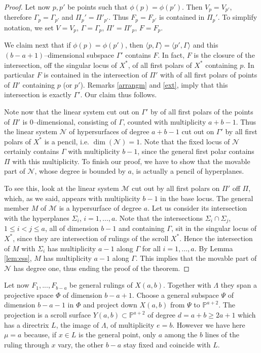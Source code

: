 \documentclass[11pt]{article}   %
\theoremstyle{definition}
\numberwithin{Theorem}{section} \numberwithin{equation}{section}
\newcommand{\MM}{{\mathcal M}}
\newcommand{\NN}{{\mathcal N}}
\newcommand{\p}{{\mathbb P}}
\begin{document}
{\begin{proof}
Let now $p,p'$ be points such that $\phi(p)=\phi(p')$. Then $V_p=V_{p'}$,
therefore $\Gamma_p=\Gamma_{p'}$
and $\Pi_p'=\Pi'_{p'}$.  Thus $F_p=F_{p'}$
is contained in $\Pi_p'$. To simplify notation,
we set $V=V_p$, $\Gamma=\Gamma_p$,
$\Pi'=\Pi'_p$, $F=F_p$.

We claim next that if  $\phi(p)=\phi(p')$,
then $\langle p,\Gamma\rangle=\langle p',\Gamma\rangle$
and this $(b-a+1)$--dimensional
subspace $\Gamma'$ contains $F$.
In fact, $F$ is the closure of the intersection, off the singular
locus of $X^ *$, of all
first polars of $X^ *$ containing $p$. In particular $F$ is contained
in the intersection of $\Pi'$ with of all first polars  of points of $\Pi'$
containing $p$ (or $p'$).
Remarks \ref {arrangm} and \ref {ext}, imply that this intersection
is exactly $\Gamma'$. Our claim thus follows.

Note now that the linear system cut out on $\Gamma'$ by of all first polars of the
points of $\Pi'$ is $0$--dimensional, consisting of $\Gamma$, counted
with multiplicity $a+b-1$. Thus
the linear system $\NN$ of hypersurfaces of degree $a+b-1$
cut out on $\Gamma'$ by all first polars
of $X^ *$ is a pencil, i.e.  $\dim(\NN)=1$.  Note that the fixed locus of
$\NN$ certainly contains $\Gamma$ with multiplicity $b-1$,
since the general first polar contains $\Pi$ with this multiplicity.
To finish our proof, we have to show that the movable part
of $\NN$, whose degree is bounded by $a$, is actually a pencil of hyperplanes.

To see this,  look at the linear system $\MM$ cut out by all first polars
on $\Pi'$ off $\Pi$, which, as we said, appears with multiplicity $b-1$ in the base locus.
The general member $M$ of $\MM$ is a hypersurface of degree $a$. Let us
consider its intersection with the hyperplanes $\Sigma_i$, $i=1,\dots,a$. Note that the
intersections $\Sigma_i\cap\Sigma_j$, $1\leq i<j\leq a$, all of dimension $b-1$ and
containing $\Gamma$, sit in the singular locus of $X^ *$, since they are intersection
of rulings of the scroll $X^ *$. Hence the
intersection of $M$ with $\Sigma_i$ has multiplicity $a-1$ along $\Gamma$
for all $i=1,\dots,a$. By Lemma \ref {lem:ess}, $M$ has multiplicity $a-1$ along
$\Gamma$. This implies  that the movable part
of $\NN$ has degree one, thus ending the proof of the theorem.
\end{proof}


Let now $F_1,...,F_{b-a}$ be general
rulings of $X(a,b)$. Together with $\Lambda$ they span a projective
space $\Phi$ of dimension $b-a+1$. Choose a general subspace $\Psi$
of dimension $b-a-1$ in $\Phi$ and project down $X(a,b)$ from $\Psi$
to $\p^ {a+2}$. The projection is a scroll surface $Y(a,b)\subset
\p^ {a+2}$ of degree $d=a+b\geq 2a+1$ which has a directrix $L$, the
image of $\Lambda$, of multiplicity $e=b$. However we have here
$\mu=a$ because, if $x\in L$ is the general point, only $a$ among
the $b$ lines of the ruling through $x$ vary, the other $b-a$ stay
fixed and coincide with $L$.



}
\end{document}
